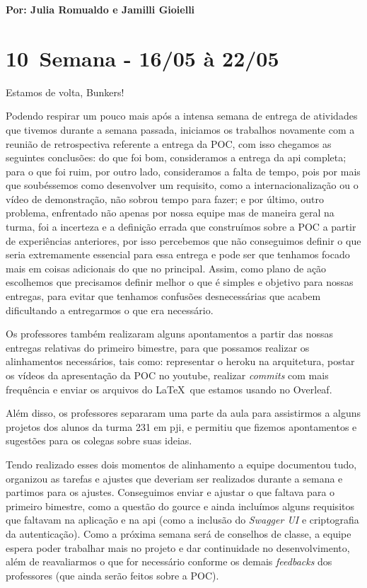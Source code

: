 \textbf{Por: Julia Romualdo e Jamilli Gioielli}

\section{10\textordfeminine \, Semana - 16/05 à 22/05}
Estamos de volta, Bunkers!

Podendo respirar um pouco mais após a intensa semana de entrega de atividades que tivemos durante a semana passada, iniciamos os trabalhos novamente com a reunião de retrospectiva referente a entrega da \gls{POC}, com isso chegamos as seguintes conclusões: do que foi bom, consideramos a entrega da \acs{api} completa;  para o que foi ruim, por outro lado, consideramos a falta de tempo, pois por mais que soubéssemos como desenvolver um requisito, como a internacionalização ou o vídeo de demonstração, não sobrou tempo para fazer; e por último, outro problema, enfrentado não apenas por nossa equipe mas de maneira geral na turma, foi a incerteza e a definição errada que construímos sobre a \gls{POC} a partir de experiências anteriores, por isso percebemos que não conseguimos definir o que seria extremamente essencial para essa entrega e pode ser que tenhamos focado mais em coisas adicionais do que no principal. Assim, como plano de ação escolhemos que precisamos definir melhor o que é simples e objetivo para nossas entregas, para evitar que tenhamos confusões desnecessárias que acabem dificultando a entregarmos o que era necessário.

Os professores também realizaram alguns apontamentos a partir das nossas entregas relativas do primeiro bimestre, para que possamos realizar os alinhamentos necessários, tais como: representar o \gls{heroku} na arquitetura, postar os vídeos da apresentação da \gls{POC} no \gls{youtube}, realizar \textit{commits} com mais frequência e enviar os arquivos do \LaTeX \, que estamos usando no Overleaf.

Além disso, os professores separaram uma parte da aula para assistirmos a alguns projetos dos alunos da turma 231 em \acs{pji}, e permitiu que fizemos apontamentos e sugestões para os colegas sobre suas ideias.

Tendo realizado esses dois momentos de alinhamento a equipe documentou tudo, organizou as tarefas e ajustes que deveriam ser realizados durante a semana e partimos para os ajustes. Conseguimos enviar e ajustar o que faltava para o primeiro bimestre, como a questão do \gls{gource} e ainda incluímos alguns requisitos que faltavam na aplicação e na \gls{api} (como a inclusão do \textit{Swagger UI} e criptografia da autenticação). Como a próxima semana será de conselhos de classe, a equipe espera poder trabalhar mais no projeto e dar continuidade no desenvolvimento, além de reavaliarmos o que for necessário conforme os demais \textit{feedbacks} dos professores (que ainda serão feitos sobre a \acs{POC}).


